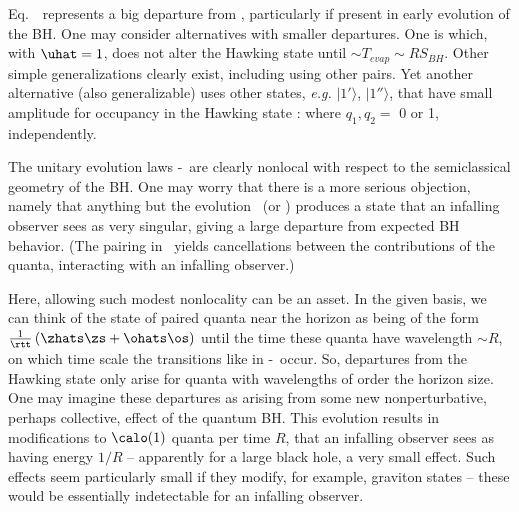 Eq.~\evolone\ represents a big departure from \paircreate, particularly if present in early evolution of the BH.  One may consider alternatives with smaller departures.  One is
%
\eqn{} 
%
which, with $\uhat=1$, does not alter the Hawking state until $\sim T_{evap}\sim R S_{BH}$.   Other simple generalizations clearly exist, including using other pairs. Yet another alternative (also generalizable) uses other states, {\it e.g.} $|1'\rangle$, $|1''\rangle$, that have small amplitude for occupancy in the Hawking state \hawkstate:
%
\eqn{}
%
where $q_1,q_2=$ 0 or 1, independently.

The unitary evolution laws \evolone-\evolthree\ are clearly nonlocal with respect to the semiclassical geometry of the BH.  One may worry that there is a more serious objection, namely that anything but the evolution \paircreate\ (or \hawkstate) produces a state that an infalling observer sees as very singular, giving a large departure from expected BH behavior.  (The pairing in \hawkstate\ yields cancellations between the contributions of the quanta, interacting with an infalling observer.)

Here, allowing such modest nonlocality can be an asset.  In the given basis, we can think of the state of paired quanta near the horizon as being of the form $ {1\over \rtt}\left(\zhats \zs+ \ohats\os\right)$ until the time these quanta have wavelength $\sim R$, on which time scale the transitions like  in \evolone-\evolthree\ occur.  So, departures from the Hawking state only arise for quanta with wavelengths of order the horizon size.  One may imagine these departures as arising from some new nonperturbative, perhaps collective, effect of the quantum BH.
This evolution results in modifications to $\calo(1)$ quanta per time $R$,  that an infalling observer sees as having energy $1/R$ -- apparently for a large black hole, a very small effect.  Such effects seem particularly small if they modify, for example, graviton states --  these would be essentially indetectable for an infalling observer.

